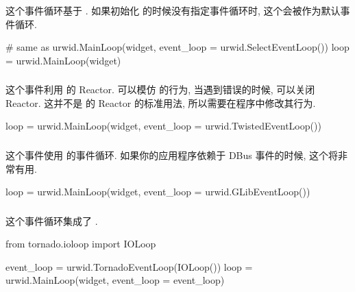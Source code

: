 \subsubsection[SelectEventLoop]{}
这个事件循环基于 . 如果初始化  的时候没有指定事件循环时, 这个会被作为默认事件循环.

\begin{codebox}[
  caption = 利用 \inlinepython{SelectEventLoop} 初始化 \inlinepython{MainLoop}
]
# same as urwid.MainLoop(widget, event_loop = urwid.SelectEventLoop())
loop = urwid.MainLoop(widget)
\end{codebox}

\subsubsection[TwistedEventLoop]{}
这个事件利用  的 Reactor.  可以模仿  的行为, 当遇到错误的时候, 可以关闭 Reactor. 这并不是  的 Reactor 的标准用法, 所以需要在程序中修改其行为.

\begin{codebox}[
  caption = 利用 \inlinepython{TwistedEventLoop} 初始化 \inlinepython{MainLoop}
]
loop = urwid.MainLoop(widget, event_loop = urwid.TwistedEventLoop())
\end{codebox}

\subsubsection[GLibEventLoop]{}
这个事件使用  的事件循环. 如果你的应用程序依赖于 DBus 事件的时候, 这个将非常有用.

\begin{codebox}[
  caption = 利用 \inlinepython{GLibEventLoop} 初始化 \inlinepython{MainLoop}
]
loop = urwid.MainLoop(widget, event_loop = urwid.GLibEventLoop())
\end{codebox}

\subsubsection[TornadoEventLoop]{}
这个事件循环集成了 .

\begin{codebox}[
  caption = 利用 \inlinepython{TornadoEventLoop} 初始化 \inlinepython{MainLoop}
]
from tornado.ioloop import IOLoop

event_loop = urwid.TornadoEventLoop(IOLoop())
loop = urwid.MainLoop(widget, event_loop = event_loop)
\end{codebox}

